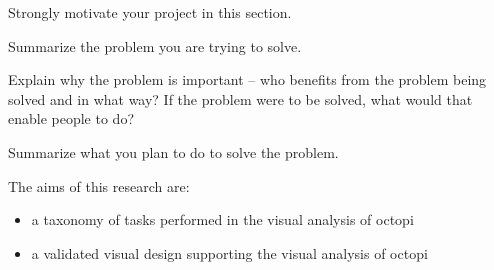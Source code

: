 
Strongly motivate your project in this section.

Summarize the problem you are trying to solve.

Explain why the problem is important -- who benefits from the problem being
solved and in what way? If the problem were to be solved, what would that
enable people to do?

Summarize what you plan to do to solve the problem.

The aims of this research are:
\begin{itemize}
  \item a taxonomy of tasks performed in the visual analysis of octopi 
  \item a validated visual design supporting the visual analysis of octopi
\end{itemize}

